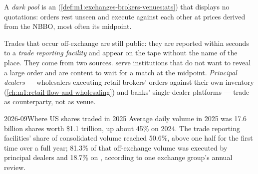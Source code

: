 \begin{definition}\label{def:m1:us-equity-market-structure:dark}
A \emph{dark pool} is an 
(\cref{def:m1:exchanges-brokers-venues:ats}) that displays no quotations:
orders rest unseen and execute against each other at prices derived from the
NBBO, most often its midpoint.
\end{definition}

Trades that occur off-exchange are still public: they are reported within
seconds to a \emph{trade reporting facility} and appear on the tape without
the name of the place. They come from two sources.  serve
institutions that do not want to reveal a large order and are content to
wait for a match at the midpoint. \emph{Principal dealers} --- wholesalers
executing retail brokers' orders against their own inventory
(\cref{ch:m1:retail-flow-and-wholesaling}) and banks' single-dealer platforms
--- trade as counterparty, not as venue.

\begin{dated}{2026-09}{Where US shares traded in 2025}\label{dat:m1:us-equity-market-structure:where}
Average daily volume in 2025 was 17.6 billion shares worth \$1.1 trillion, up
about 45\% on 2024. The trade reporting facilities' share of consolidated
volume reached 50.6\%, above one half for the first time over a full year;
81.3\% of that off-exchange volume was executed by principal dealers and
18.7\% on , according to one exchange group's
annual review.
\end{dated}

\begin{omfigure}

\end{omfigure}

